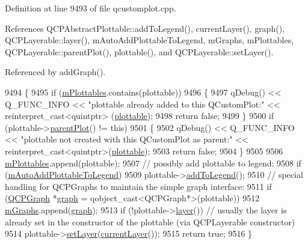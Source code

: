 Definition at line 9493 of file qcustomplot.\+cpp.



References Q\+C\+P\+Abstract\+Plottable\+::add\+To\+Legend(), current\+Layer(), graph(), Q\+C\+P\+Layerable\+::layer(), m\+Auto\+Add\+Plottable\+To\+Legend, m\+Graphs, m\+Plottables, Q\+C\+P\+Layerable\+::parent\+Plot(), plottable(), and Q\+C\+P\+Layerable\+::set\+Layer().



Referenced by add\+Graph().


\begin{DoxyCode}
9494 \{
9495   \textcolor{keywordflow}{if} (\hyperlink{class_q_custom_plot_a62bf8e4e7f8d23fc1e9301ba0148269f}{mPlottables}.contains(plottable))
9496   \{
9497     qDebug() << Q\_FUNC\_INFO << \textcolor{stringliteral}{"plottable already added to this QCustomPlot:"} << \textcolor{keyword}{reinterpret\_cast<}quintptr\textcolor{keyword}{>}
      (\hyperlink{class_q_custom_plot_adea38bdc660da9412ba69fb939031567}{plottable});
9498     \textcolor{keywordflow}{return} \textcolor{keyword}{false};
9499   \}
9500   \textcolor{keywordflow}{if} (plottable->\hyperlink{class_q_c_p_layerable_ab7e0e94461566093d36ffc0f5312b109}{parentPlot}() != \textcolor{keyword}{this})
9501   \{
9502     qDebug() << Q\_FUNC\_INFO << \textcolor{stringliteral}{"plottable not created with this QCustomPlot as parent:"} << \textcolor{keyword}{
      reinterpret\_cast<}quintptr\textcolor{keyword}{>}(\hyperlink{class_q_custom_plot_adea38bdc660da9412ba69fb939031567}{plottable});
9503     \textcolor{keywordflow}{return} \textcolor{keyword}{false};
9504   \}
9505   
9506   \hyperlink{class_q_custom_plot_a62bf8e4e7f8d23fc1e9301ba0148269f}{mPlottables}.append(plottable);
9507   \textcolor{comment}{// possibly add plottable to legend:}
9508   \textcolor{keywordflow}{if} (\hyperlink{class_q_custom_plot_aaf3ea6a4cb04d35a149cc9a0cdac3394}{mAutoAddPlottableToLegend})
9509     plottable->\hyperlink{class_q_c_p_abstract_plottable_a70f8cabfd808f7d5204b9f18c45c13f5}{addToLegend}();
9510   \textcolor{comment}{// special handling for QCPGraphs to maintain the simple graph interface:}
9511   \textcolor{keywordflow}{if} (\hyperlink{class_q_c_p_graph}{QCPGraph} *\hyperlink{class_q_custom_plot_a80c40ced2a74eefe9e92de1e82ba2274}{graph} = qobject\_cast<QCPGraph*>(plottable))
9512     \hyperlink{class_q_custom_plot_adaf8d407d72a725169d7dbed2ee386bb}{mGraphs}.append(\hyperlink{class_q_custom_plot_a80c40ced2a74eefe9e92de1e82ba2274}{graph});
9513   \textcolor{keywordflow}{if} (!plottable->\hyperlink{class_q_c_p_layerable_aea67e8c19145e70d68c286a36f6b8300}{layer}()) \textcolor{comment}{// usually the layer is already set in the constructor of the plottable
       (via QCPLayerable constructor)}
9514     plottable->\hyperlink{class_q_c_p_layerable_ab0d0da6d2de45a118886d2c8e16d5a54}{setLayer}(\hyperlink{class_q_custom_plot_af73057345656cbd1463454982d808b00}{currentLayer}());
9515   \textcolor{keywordflow}{return} \textcolor{keyword}{true};
9516 \}
\end{DoxyCode}


